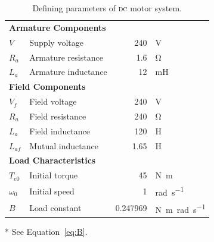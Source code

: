 \documentclass[a4paper,10pt]{article}
\newcommand{\V}{\si{\volt}\xspace}
\newcommand{\Ohm}{\si{\ohm}\xspace}
\renewcommand{\H}{\si{\henry}\xspace}
\newcommand{\mH}{\si{\milli\henry}\xspace}
\newcommand{\Nm}{\si{\newton\metre}\xspace}
\newcommand{\rps}{\si{\radian\per\second}\xspace}
\newcommand{\Nmspr}{\si{\newton\metre\radian\per\second}\xspace}
\newcommand{\DC}{\textsc{dc}\xspace}
\begin{document}
\begin{table}[t]
    \centering
    \begin{threeparttable}
        \caption{Defining parameters of \DC motor system.}
        \label{table:Parameters}
        \begin{tabular}{llrl}
            \toprule
            \multicolumn{4}{l}{\textbf{Armature Components}} \\
            \hspace{1em}$V$   & Supply voltage      & 240 & \V \\
            \hspace{1em}$R_a$ & Armature resistance & 1.6 & \Ohm \\
            \hspace{1em}$L_a$ & Armature inductance &  12 & \mH \\
            \midrule
            \multicolumn{4}{l}{\textbf{Field Components}} \\
            \hspace{1em}$V_f$    & Field voltage     &  240 & \V \\
            \hspace{1em}$R_a$    & Field resistance  &  240 & \Ohm \\
            \hspace{1em}$L_a$    & Field inductance  &  120 & \H \\
            \hspace{1em}$L_{af}$ & Mutual inductance & 1.65 & \H \\
            \midrule
            \multicolumn{4}{l}{\textbf{Load Characteristics}} \\
            \hspace{1em}$T_{e0}$   & Initial torque         & 45       & \Nm \\
            \hspace{1em}$\omega_0$ & Initial speed          &  1       & \rps \\
            \hspace{1em}$B$        & Load constant\tnote{*} & 0.247969 & \Nmspr 
            \\
            \bottomrule
        \end{tabular}
        \begin{tablenotes}
            \item[*]See Equation~\vref{eq:B}.
        \end{tablenotes}
    \end{threeparttable}
\end{table}
\end{document}
